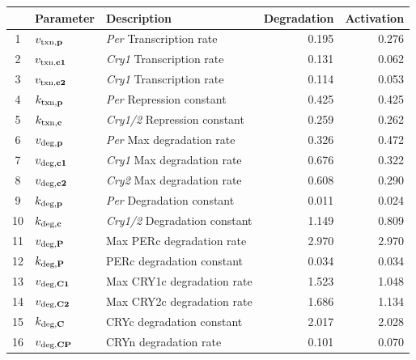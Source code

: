 \begin{table}[p]
  \label{tab:parset}
  \vspace{2mm}
  \centering
  \begin{tabular}{cllrr} \toprule
    & Parameter                 & Description                       & Degradation & Activation \\ \midrule
    1  & $v_{\text{txn,{\bf p}}}$  & {\it Per} Transcription rate      & 0.195       & 0.276 \\
    2  & $v_{\text{txn,{\bf c1}}}$ & {\it Cry1} Transcription rate     & 0.131       & 0.062 \\
    3  & $v_{\text{txn,{\bf c2}}}$ & {\it Cry1} Transcription rate     & 0.114       & 0.053 \\
    4  & $k_{\text{txn,{\bf p}}}$  & {\it Per} Repression constant     & 0.425       & 0.425 \\
    5  & $k_{\text{txn,{\bf c}}}$  & {\it Cry1/2} Repression constant  & 0.259       & 0.262 \\
    6  & $v_{\text{deg,{\bf p}}}$  & {\it Per} Max degradation rate    & 0.326       & 0.472 \\
    7  & $v_{\text{deg,{\bf c1}}}$ & {\it Cry1} Max degradation rate   & 0.676       & 0.322 \\
    8  & $v_{\text{deg,{\bf c2}}}$ & {\it Cry2} Max degradation rate   & 0.608       & 0.290 \\
    9  & $k_{\text{deg,{\bf p}}}$  & {\it Per} Degradation constant    & 0.011       & 0.024 \\
    10 & $k_{\text{deg,{\bf c}}}$  & {\it Cry1/2} Degradation constant & 1.149       & 0.809 \\
    11 & $v_{\text{deg,{\bf P}}}$  & Max PERc degradation rate         & 2.970       & 2.970 \\
    12 & $k_{\text{deg,{\bf P}}}$  & PERc degradation constant         & 0.034       & 0.034 \\
    13 & $v_{\text{deg,{\bf C1}}}$ & Max CRY1c degradation rate        & 1.523       & 1.048 \\
    14 & $v_{\text{deg,{\bf C2}}}$ & Max CRY2c degradation rate        & 1.686       & 1.134 \\
    15 & $k_{\text{deg,{\bf C}}}$  & CRYc degradation constant         & 2.017       & 2.028 \\
    16 & $v_{\text{deg,{\bf CP}}}$ & CRYn degradation rate             & 0.101       & 0.070 \\

\end{tabular}
\end{table}
